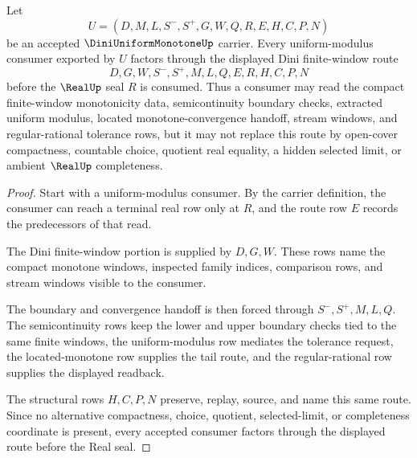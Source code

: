 \begin{theorem}\label{thm:dini-uniform-monotone-finite-modulus-route}
Let
$$
U=(D,M,L,S^{-},S^{+},G,W,Q,R,E,H,C,P,N)
$$
be an accepted $\DiniUniformMonotoneUp$ carrier. Every uniform-modulus consumer exported by $U$ factors through the displayed Dini finite-window route
$$
D,G,W,S^{-},S^{+},M,L,Q,E,R,H,C,P,N
$$
before the $\RealUp$ seal $R$ is consumed. Thus a consumer may read the compact finite-window monotonicity data, semicontinuity boundary checks, extracted uniform modulus, located monotone-convergence handoff, stream windows, and regular-rational tolerance rows, but it may not replace this route by open-cover compactness, countable choice, quotient real equality, a hidden selected limit, or ambient $\RealUp$ completeness.
\end{theorem}
\begin{proof}
Start with a uniform-modulus consumer. By the carrier definition, the consumer can reach a terminal real row only at $R$, and the route row $E$ records the predecessors of that read.

The Dini finite-window portion is supplied by $D,G,W$. These rows name the compact monotone windows, inspected family indices, comparison rows, and stream windows visible to the consumer.

The boundary and convergence handoff is then forced through $S^{-},S^{+},M,L,Q$. The semicontinuity rows keep the lower and upper boundary checks tied to the same finite windows, the uniform-modulus row mediates the tolerance request, the located-monotone row supplies the tail route, and the regular-rational row supplies the displayed readback.

The structural rows $H,C,P,N$ preserve, replay, source, and name this same route. Since no alternative compactness, choice, quotient, selected-limit, or completeness coordinate is present, every accepted consumer factors through the displayed route before the Real seal.
\end{proof}

